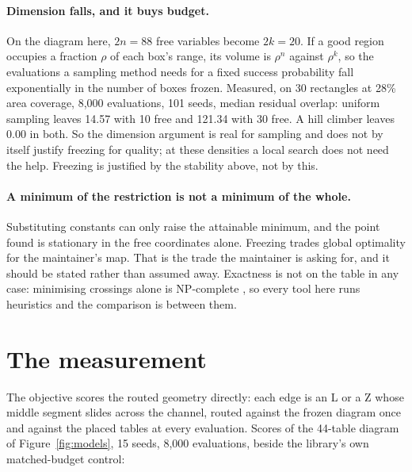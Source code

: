 \documentclass[11pt]{article}
\begin{document}
\paragraph{Dimension falls, and it buys budget.} On the diagram here, $2n = 88$ free
variables become $2k = 20$. If a good region occupies a fraction $\rho$ of each box's range,
its volume is $\rho^{n}$ against $\rho^{k}$, so the evaluations a sampling method needs for
a fixed success probability fall exponentially in the number of boxes frozen. Measured, on
30 rectangles at 28\% area coverage, 8{,}000 evaluations, 101 seeds, median residual
overlap: uniform sampling leaves 14.57 with 10 free and 121.34 with 30 free. A hill climber
leaves 0.00 in both. So the dimension argument is real for sampling and does not by itself
justify freezing for quality; at these densities a local search does not need the help.
Freezing is justified by the stability above, not by this.

\paragraph{A minimum of the restriction is not a minimum of the whole.} Substituting
constants can only raise the attainable minimum, and the point found is stationary in the
free coordinates alone. Freezing trades global optimality for the maintainer's map. That is
the trade the maintainer is asking for, and it should be stated rather than assumed away.
Exactness is not on the table in any case: minimising crossings alone is NP-complete
\cite{gj83}, so every tool here runs heuristics and the comparison is between them.

\section{The measurement}

The objective scores the routed geometry directly: each edge is an L or a Z whose middle
segment slides across the channel, routed against the frozen diagram once and against the
placed tables at every evaluation. Scores of the 44-table diagram of
Figure~\ref{fig:models}, 15 seeds, 8{,}000 evaluations, beside the library's own
matched-budget control:
\end{document}

